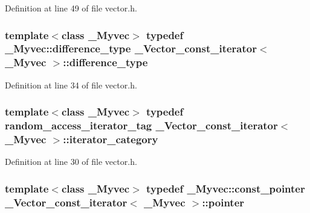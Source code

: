 Definition at line 49 of file vector.\+h.

\hypertarget{class___vector__const__iterator_a4fad8668028c0db06eda92c190eeca39}{
\subsubsection[{difference\+\_\+type}]{\setlength{\rightskip}{0pt plus 5cm}template$<$class \+\_\+\+Myvec$>$ typedef \+\_\+\+Myvec\+::difference\+\_\+type {\bf \+\_\+\+Vector\+\_\+const\+\_\+iterator}$<$ \+\_\+\+Myvec $>$\+::{\bf difference\+\_\+type}}}\label{class___vector__const__iterator_a4fad8668028c0db06eda92c190eeca39}


Definition at line 34 of file vector.\+h.

\hypertarget{class___vector__const__iterator_a3e45b76a1bb5d1c6adb70bf8d924d1e5}{
\subsubsection[{iterator\+\_\+category}]{\setlength{\rightskip}{0pt plus 5cm}template$<$class \+\_\+\+Myvec$>$ typedef random\+\_\+access\+\_\+iterator\+\_\+tag {\bf \+\_\+\+Vector\+\_\+const\+\_\+iterator}$<$ \+\_\+\+Myvec $>$\+::{\bf iterator\+\_\+category}}}\label{class___vector__const__iterator_a3e45b76a1bb5d1c6adb70bf8d924d1e5}


Definition at line 30 of file vector.\+h.

\hypertarget{class___vector__const__iterator_a301a1187c227c820bd86335496229e6a}{
\subsubsection[{pointer}]{\setlength{\rightskip}{0pt plus 5cm}template$<$class \+\_\+\+Myvec$>$ typedef \+\_\+\+Myvec\+::const\+\_\+pointer {\bf \+\_\+\+Vector\+\_\+const\+\_\+iterator}$<$ \+\_\+\+Myvec $>$\+::{\bf pointer}}}\label{class___vector__const__iterator_a301a1187c227c820bd86335496229e6a}


